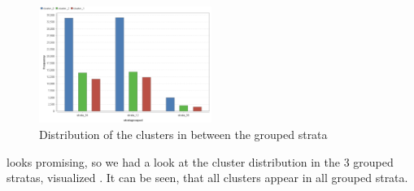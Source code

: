 \begin{figure}[!htbp]
\centering
\includegraphics[width=0.5\textwidth]{ClusterOrigRapidDistribution2Cluster.PNG}
\caption{Distribution of the clusters in between the grouped strata}
\label{fig:Groupdist}
\end{figure}

 looks promising, so we had a look at the cluster distribution in the 3 grouped stratas, visualized . It can be seen, that all clusters appear in all grouped strata. 

